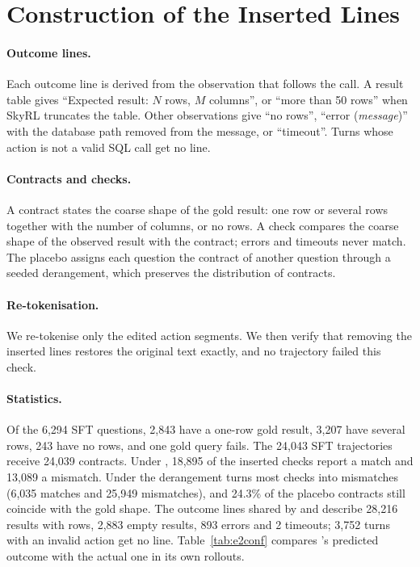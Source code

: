 


\section{Construction of the Inserted Lines}
\label{app:construction}

\paragraph{Outcome lines.}
Each outcome line is derived from the observation that follows the call. A result table gives ``Expected result: $N$ rows, $M$ columns'', or ``more than 50 rows'' when SkyRL truncates the table. Other observations give ``no rows'', ``error (\emph{message})'' with the database path removed from the message, or ``timeout''. Turns whose action is not a valid SQL call get no line.

\paragraph{Contracts and checks.}
A contract states the coarse shape of the gold result: one row or several rows together with the number of columns, or no rows. A check compares the coarse shape of the observed result with the contract; errors and timeouts never match. The placebo assigns each question the contract of another question through a seeded derangement, which preserves the distribution of contracts.

\paragraph{Re-tokenisation.}
We re-tokenise only the edited action segments. We then verify that removing the inserted lines restores the original text exactly, and no trajectory failed this check.

\paragraph{Statistics.}
Of the 6,294 SFT questions, 2,843 have a one-row gold result, 3,207 have several rows, 243 have no rows, and one gold query fails. The 24,043 SFT trajectories receive 24,039 contracts. Under \armG{}, 18,895 of the inserted checks report a match and 13,089 a mismatch. Under \armGp{} the derangement turns most checks into mismatches (6,035 matches and 25,949 mismatches), and 24.3\% of the placebo contracts still coincide with the gold shape. The outcome lines shared by \armE{} and \armF{} describe 28,216 results with rows, 2,883 empty results, 893 errors and 2 timeouts; 3,752 turns with an invalid action get no line. Table~\ref{tab:e2conf} compares \armF's predicted outcome with the actual one in its own rollouts.

